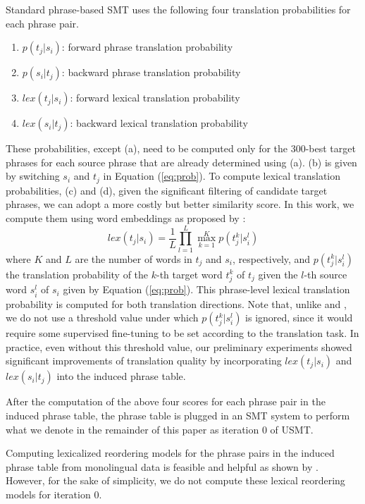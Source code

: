 \documentclass[11pt,a4paper]{article}
\newcommand{\Eq}[1]{{Equation (\ref{eq:#1})}}
\begin{document}
Standard phrase-based SMT uses the following four translation probabilities for each phrase pair.
\begin{enumerate}[label=(\alph*)]\itemsep=0mm
\item $p(t_j|s_i)$: forward phrase translation probability
\item $p(s_i|t_j)$: backward phrase translation probability
\item $lex(t_j|s_i)$: forward lexical translation probability
\item $lex(s_i|t_j)$: backward lexical translation probability
\end{enumerate} 
These probabilities, except (a), need to be computed only for the 300-best target phrases for each source phrase that are already determined using (a). (b) is given by switching $s_i$ and $t_j$ in \Eq{prob}. To compute lexical translation probabilities, (c) and (d), given the significant filtering of candidate target phrases, we can adopt a more costly but better similarity score.
In this work, we compute them using word embeddings as proposed by \citet{N15-1138}:
\begin{equation}
\label{eq:problex}
lex(t_j|s_i) = \frac{1}{L}\prod_{l=1}^{L}\max_{k=1}^{K}p(t_j^k|s_i^l)
\end{equation}
where $K$ and $L$ are the number of words in $t_j$ and $s_i$, respectively, and $p(t_j^k|s_i^l)$ the translation probability of the $k$-th target word $t_j^k$ of $t_j$ given the $l$-th source word $s_i^l$ of $s_i$ given by \Eq{prob}.  This phrase-level lexical translation probability is computed for both translation directions.
Note that, unlike \citet{N15-1138} and \citet{C16-1109}, we do not use a threshold value under which $p(t_j^k|s_i^l)$ is ignored, since it would require some supervised fine-tuning to be set according to the translation task. In practice, even without this threshold value, our preliminary experiments showed significant improvements of translation quality by incorporating $lex(t_j|s_i)$ and  $lex(s_i|t_j)$ into the induced phrase table.

After the computation of the above four scores for each phrase pair in the induced phrase table, the phrase table is plugged in an SMT system to perform what we denote in the remainder of this paper as iteration 0 of USMT.

Computing lexicalized reordering models for the phrase pairs in the induced phrase table from monolingual data is feasible and helpful as shown by \citet{klementiev-EtAl:2012:EACL2012}. However, for the sake of simplicity, we do not compute these lexical reordering models for iteration 0.
\end{document}
